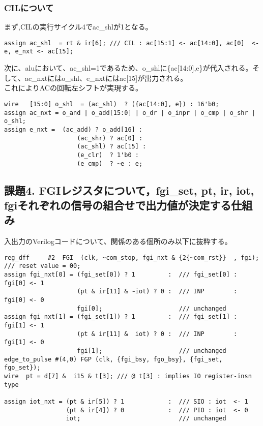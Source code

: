 \documentclass{jsarticle}
\begin{document}
\subsubsection*{CILについて}
まず,CILの実行サイクル4でac\_shlが1となる。 \\
\begin{lstlisting}[caption=cpu\_ex3.v 171行目]
assign ac_shl  = rt & ir[6]; /// CIL : ac[15:1] <- ac[14:0], ac[0]  <- e, e_nxt <- ac[15];
\end{lstlisting}
次に、aluにおいて、ac\_shl=1であるため、o\_shlに\{ac[14:0],e\}が代入される。そして、ac\_nxtにはo\_shl、e\_nxtにはac[15]が出力される。 \\
これによりACの回転左シフトが実現する。
\begin{lstlisting}[caption=cpu\_module.v ALU modelより]
wire   [15:0] o_shl  = (ac_shl)  ? ({ac[14:0], e}) : 16'b0;
assign ac_nxt = o_and | o_add[15:0] | o_dr | o_inpr | o_cmp | o_shr | o_shl;
assign e_nxt =  (ac_add) ? o_add[16] :
                    (ac_shr) ? ac[0] :
                    (ac_shl) ? ac[15] :
                    (e_clr)  ? 1'b0 :
                    (e_cmp)  ? ~e : e;
\end{lstlisting}





\subsection*{課題4. FGIレジスタについて，fgi\_set, pt, ir, iot, fgiそれぞれの信号の組合せで出力値が決定する仕組み}
入出力のVerilogコードについて、関係のある個所のみ以下に抜粋する。
\begin{lstlisting}
reg_dff     #2  FGI  (clk, ~com_stop, fgi_nxt & {2{~com_rst}}  , fgi);  /// reset value = 00;
assign fgi_nxt[0] = (fgi_set[0]) ? 1         :  /// fgi_set[0] : fgi[0] <- 1
                    (pt & ir[11] & ~iot) ? 0 :  /// INP        : fgi[0] <- 0
                    fgi[0];                     /// unchanged
assign fgi_nxt[1] = (fgi_set[1]) ? 1         :  /// fgi_set[1] : fgi[1] <- 1
                    (pt & ir[11] &  iot) ? 0 :  /// INP        : fgi[1] <- 0
                    fgi[1];                     /// unchanged
edge_to_pulse #(4,0) FGP (clk, {fgi_bsy, fgo_bsy}, {fgi_set, fgo_set});
wire  pt = d[7] &  i15 & t[3]; /// @ t[3] : implies IO register-insn type

assign iot_nxt = (pt & ir[5]) ? 1            :  /// SIO : iot  <- 1
                 (pt & ir[4]) ? 0            :  /// PIO : iot  <- 0
                 iot;                           /// unchanged
\end{lstlisting}
\end{document}
